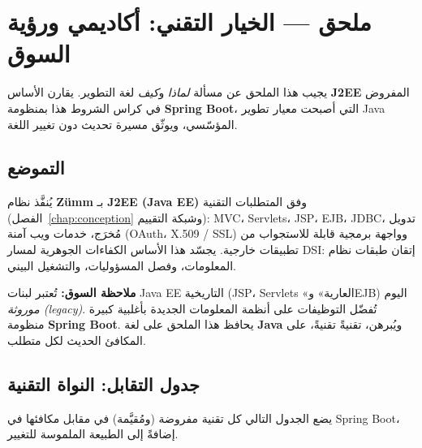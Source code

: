 
\chapter{ملحق --- الخيار التقني: أكاديمي ورؤية السوق}
\label{chap:migration}
يجيب هذا الملحق عن مسألة \emph{لماذا} و\emph{كيف} لغة التطوير. يقارن الأساس
\textbf{J2EE} المفروض في كراس الشروط هذا بمنظومة \textbf{Spring Boot}، التي
أصبحت معيار تطوير Java المؤسّسي، ويوثّق مسيرة تحديث دون تغيير اللغة.

\section{التموضع}
يُنفَّذ نظام \textbf{Zümm} بـ \textbf{J2EE (Java EE)} وفق المتطلبات التقنية
(الفصل~\ref{chap:conception} وشبكة التقييم): MVC، Servlets، JSP، EJB، JDBC،
تدويل مُخرَج، خدمات ويب آمنة (OAuth، X.509 / SSL) وواجهة برمجية قابلة للاستجواب
من تطبيقات خارجية. يجسّد هذا الأساس الكفاءات الجوهرية لمسار DSI: إتقان طبقات نظام
المعلومات، وفصل المسؤوليات، والتشغيل البيني.

\begin{encadre}
\textbf{ملاحظة السوق:} تُعتبر لبنات Java EE التاريخية (JSP، Servlets «العارية»
وEJB) اليوم \emph{موروثة (legacy)}. تُفضّل التوظيفات على أنظمة المعلومات الجديدة
بأغلبية كبيرة منظومة \textbf{Spring Boot}. يحافظ هذا الملحق على لغة \textbf{Java}
ويُبرهن، تقنيةً تقنيةً، على المكافئ الحديث لكل متطلب.
\end{encadre}

\section{جدول التقابل: النواة التقنية}
يضع الجدول التالي كل تقنية مفروضة (ومُقيَّمة) في مقابل مكافئها في Spring Boot،
إضافةً إلى الطبيعة الملموسة للتغيير.

